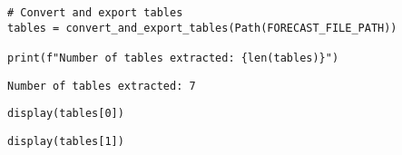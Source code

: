 \begin{verbatim}
# Convert and export tables
tables = convert_and_export_tables(Path(FORECAST_FILE_PATH))

print(f"Number of tables extracted: {len(tables)}")
\end{verbatim}




\begin{verbatim}
Number of tables extracted: 7
\end{verbatim}




\begin{verbatim}
display(tables[0])
\end{verbatim}



\begin{verbatim}
display(tables[1])
\end{verbatim}

